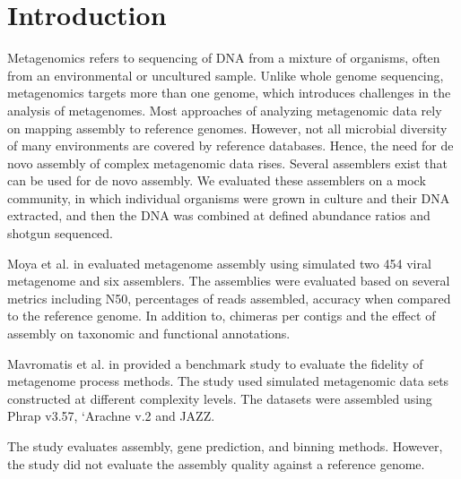 \documentclass[10pt,a4paper,twocolumn]{article}
\begin{document}
\clearpage

\section*{Introduction}

Metagenomics refers to sequencing of DNA from a mixture of organisms,
often from an environmental or uncultured sample. Unlike whole genome
sequencing, metagenomics targets more than one genome, which
introduces challenges in the analysis of metagenomes.  Most approaches
of analyzing metagenomic data rely on mapping assembly to reference
genomes. However, not all microbial diversity of many environments are
covered by reference databases. Hence, the need for de novo assembly
of complex metagenomic data rises. Several assemblers exist that can
be used for de novo assembly.  We evaluated these assemblers on a mock
community, in which individual organisms were grown in culture and
their DNA extracted, and then the DNA was combined at defined
abundance ratios and shotgun sequenced.

 
 
 Moya et al. in \cite{moya2014} evaluated metagenome assembly using
 simulated two 454 viral metagenome and six assemblers. The assemblies
 were evaluated based on several metrics including N50, percentages of
 reads assembled, accuracy when compared to the reference genome. In
 addition to, chimeras per contigs and the effect of assembly on
 taxonomic and functional annotations.
 
Mavromatis et al. in \cite{mavromatis2007} provided a benchmark study
to evaluate the fidelity of metagenome process methods. The study used
simulated metagenomic data sets constructed at different complexity
levels.
The datasets were assembled using Phrap v3.57, `Arachne v.2
\cite{arachne} and JAZZ. \cite{jazz}

The study evaluates assembly, gene prediction, and binning
methods. However, the study did not evaluate the assembly quality
against a reference genome.
\end{document}
